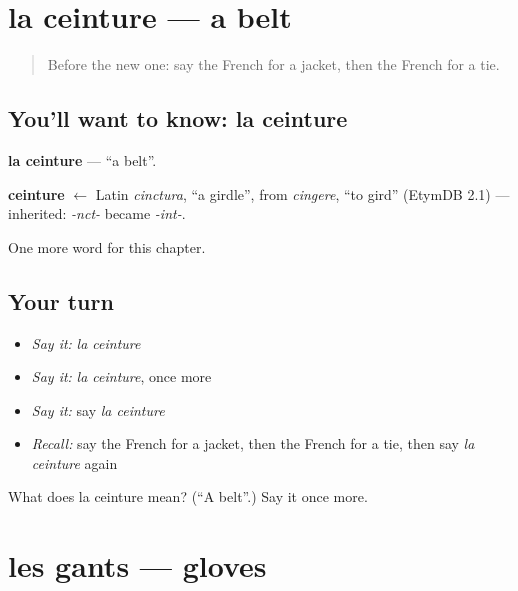 \section[la ceinture]{la ceinture — a belt}

\label{lesson:FR-C116-ceinture}



\begin{quote}
Before the new one: say the French for a jacket, then the French for a tie.
\end{quote}

\subsection*{You'll want to know: la ceinture}
\textbf{la ceinture} — \textquotedblleft{}a belt\textquotedblright{}.

\begin{cousinweb}
\textbf{ceinture} $\leftarrow$ Latin \emph{cinctura}, \textquotedblleft{}a girdle\textquotedblright{}, from \emph{cingere}, \textquotedblleft{}to gird\textquotedblright{} (EtymDB 2.1) — inherited: \emph{-nct-} became \emph{-int-}.
\end{cousinweb}

\begin{grammarlens}[title={What you've built}]
One more word for this chapter.
\end{grammarlens}

\subsection*{Your turn}
\begin{itemize}
\raggedright
  \item \emph{Say it:} \emph{la ceinture}
  \item \emph{Say it:} \emph{la ceinture}, once more
  \item \emph{Say it:} say \emph{la ceinture}
  \item \emph{Recall:} say the French for a jacket, then the French for a tie, then say \emph{la ceinture} again
\end{itemize}

\begin{tcolorbox}[breakable,colback=teal!4,colframe=teal!35!black,title={Before you move on}]
What does la ceinture mean? (\textquotedblleft{}A belt\textquotedblright{}.) Say it once more.
\end{tcolorbox}
\section[les gants]{les gants — gloves}


